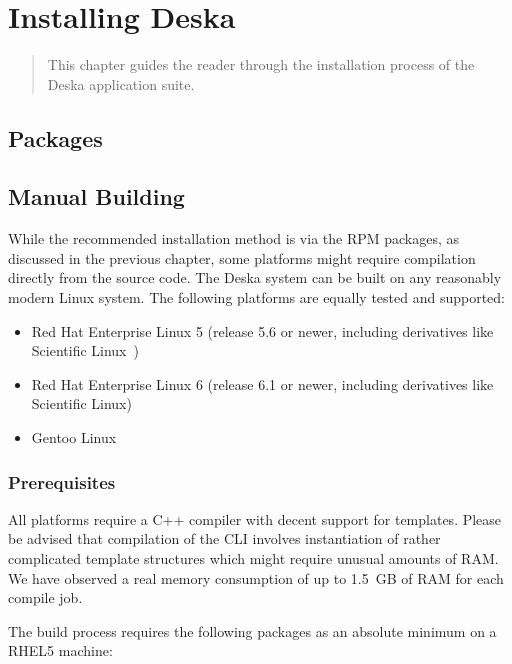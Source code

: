 \documentclass[deska]{subfiles}
\begin{document}
\chapter{Installing Deska}
\label{sec:building}

\begin{abstract}
This chapter guides the reader through the installation process of the Deska application suite.
\end{abstract}

\section{Packages}


\section{Manual Building}

While the recommended installation method is via the RPM packages, as discussed in the previous chapter, some platforms
might require compilation directly from the source code.  The Deska system can be built on any reasonably modern Linux
system.  The following platforms are equally tested and supported:

\begin{itemize}
    \item Red Hat Enterprise Linux \cite{rhel} 5 (release 5.6 or newer, including derivatives like Scientific
        Linux~\cite{scientific-linux})
    \item Red Hat Enterprise Linux 6 (release 6.1 or newer, including derivatives like Scientific Linux)
    \item Gentoo Linux~\cite{gentoo}
\end{itemize}

\subsection{Prerequisites}

All platforms require a C++ compiler with decent support for templates.  Please be advised that compilation of the CLI
involves instantiation of rather complicated template structures which might require unusual amounts of RAM.  We have
observed a real memory consumption of up to 1.5~GB of RAM for each compile job.

The build process requires the following packages as an absolute minimum on a RHEL5 machine:
\end{document}
